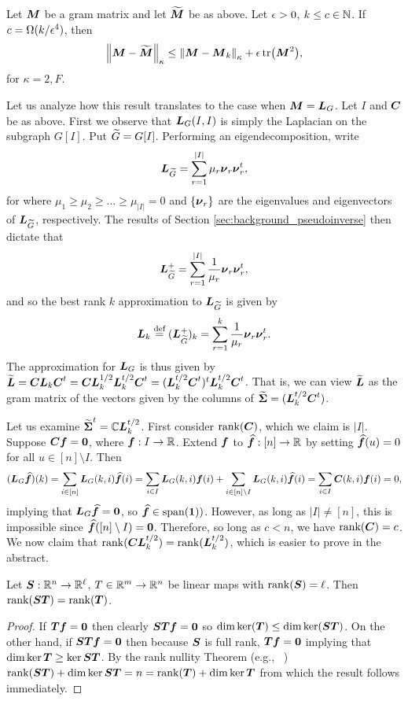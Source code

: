 \begin{theorem}
	Let ${\vb*{M}}$ be a gram matrix and let $\widetilde{{\vb*{M}}}$ be as above. Let $\epsilon>0$,  $k\leq c\in\mathbb{N}$. If $c=\Omega(k/\epsilon^4)$, then 
	\begin{equation*}
	\norm{{\vb*{M}}-\widetilde{{\vb*{M}}}}_\kappa \leq \norm{{\vb*{M}}-{\vb*{M}}_k}_\kappa + \epsilon \tr({\vb*{M}}^2),
	\end{equation*}
	for $\kappa=2,F$. 
\end{theorem}

Let us analyze how this result translates to the case when ${\vb*{M}}=\vb*{L}_G$. Let $I$ and $\vb*{C}$ be as above. First we observe that $\vb*{L}_G(I,I)$ is simply the Laplacian on the subgraph $G[I]$. Put ${\widetilde{G}} = G[I]$. Performing an eigendecomposition, write 
\begin{equation*}
\vb*{L}_{\widetilde{G}} = \sum_{r=1}^{|I|} \mu_r \vb*{\nu}_r\vb*{\nu}_r^t,
\end{equation*}
for where $\mu_1\geq \mu_2\geq \dots \geq \mu_{|I|}=0$ and $\{\vb*{\nu}_r\}$ are the eigenvalues and eigenvectors of $\vb*{L}_{\widetilde{G}}$, respectively. The results of Section \ref{sec:background_pseudoinverse} then dictate that 
\begin{equation*}
\vb*{L}_{\widetilde{G}}^+ = \sum_{r=1}^{|I|} \frac{1}{\mu_r} \vb*{\nu}_r\vb*{\nu}_r^t,
\end{equation*}
and so the best rank $k$ approximation to $\vb*{L}_{\widetilde{G}}$ is given by 
\begin{equation*}
\vb*{L}_k \overset{\text{def}}{=} (\vb*{L}_{\widetilde{G}}^+)_k = \sum_{r=1}^{k} \frac{1}{\mu_r} \vb*{\nu}_r\vb*{\nu}_r^t.
\end{equation*}
The approximation for $\vb*{L}_G$ is thus given by $\widetilde{\vb*{L}}=\vb*{C}\vb*{L}_k\vb*{C}^t=\vb*{C}\vb*{L}_k^{1/2}\vb*{L}_k^{t/2}\vb*{C}^t = (\vb*{L}_k^{t/2}\vb*{C}^t)^t \vb*{L}_k^{t/2}\vb*{C}^t$. That is, we can view $\widetilde{\vb*{L}}$ as the gram matrix of the vectors given by the columns of $\widetilde{\boldsymbol{\Sigma}} =  (\vb*{L}_k^{t/2}\vb*{C}^t)$. 

Let us examine $\widetilde{\boldsymbol{\Sigma}}^t=\mathbb{C}\vb*{L}_k^{t/2}$. First consider $\rank(\vb*{C})$, which we claim is $|I|$. Suppose $\vb*{C}\vb*{f}=\vb{0}$, where $\vb*{f}:I \to \mathbb{R}$. Extend $\vb*{f}$ to $\vb*{\widehat{f}}:[n]\to\mathbb{R}$ by setting $\vb*{\widehat{f}}(u)=0$ for all $u\in [n]\setminus I$. Then 
\[(\vb*{L}_G\vb*{\widehat{f}})(k) = \sum_{i\in[n]}\vb*{L}_G(k,i)\vb*{\widehat{f}}(i) = \sum_{i\in I}\vb*{L}_G(k,i) \vb*{f}(i) + \sum_{i\in[n]\setminus I} \vb*{L}_G(k,i)\vb*{\widehat{f}}(i) = \sum_{i\in I}\vb*{C}(k,i) \vb*{f}(i) = 0,\]
implying that $\vb*{L}_G\vb*{\widehat{f}}=\vb{0}$, so $\vb*{\widehat{f}}\in\textnormal{span}(\vb{1}))$. However, as long as $|I|\neq[n]$, this is impossible since  $\vb*{\widehat{f}}([n]\setminus I)=\vb{0}$. Therefore, so long as $c<n$, we have $\rank(\vb*{C}) = c$. 
We now claim that $\rank(\vb*{C}\vb*{L}_k^{t/2}) = \rank(\vb*{L}_k^{t/2})$, which is easier to prove in the abstract. 

\begin{lemma}
	Let $\vb*{S}:\mathbb{R}^n\to\mathbb{R}^\ell$, $T\in\mathbb{R}^m\to\mathbb{R}^n$ be linear maps with $\rank(\vb*{S})=\ell$. Then $\rank(\vb*{S}\vb*{T}) = \rank(\vb*{T})$. 
\end{lemma}
\begin{proof}
	If $\vb*{T}\vb*{f}=\vb{0}$ then clearly $\vb*{S}\vb*{T}\vb*{f}=\vb{0}$ so $\dim\ker(\vb*{T})\leq \dim\ker(\vb*{S}\vb*{T})$. On the other hand, if $\vb*{S}\vb*{T}\vb*{f}=\vb{0}$ then because $\vb*{S}$ is full rank, $\vb*{T}\vb*{f}=\vb{0}$ implying that $\dim \ker \vb*{T}\ge \ker\vb*{S}\vb*{T}$. 	By the rank nullity Theorem (e.g., ~\cite{axler1997linear}) $\rank(\vb*{S}\vb*{T}) + \dim\ker \vb*{S}\vb*{T} = n = \rank(\vb*{T}) + \dim\ker\vb*{T}$ from which the result follows immediately. 
\end{proof}

